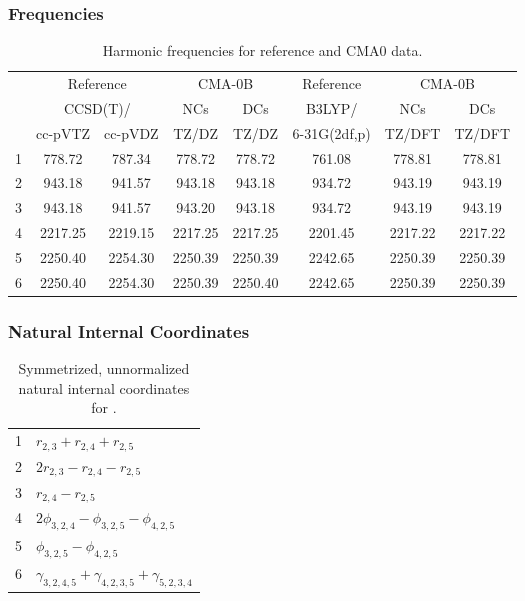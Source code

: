 \documentclass[10pt,oneside]{article}
\begin{document}
\clearpage

\subsubsection*{Frequencies}
\begin{table}[h!]
\centering
\caption{Harmonic frequencies for reference and CMA0 data.}
\begin{tabular}{cccccccc}
\toprule
{} & \multicolumn{2}{c}{Reference} & \multicolumn{2}{c}{CMA-0B} &    Reference & \multicolumn{2}{c}{CMA-0B} \\
{} & \multicolumn{2}{c}{CCSD(T)/} &     NCs &     DCs &       B3LYP/ &     NCs &     DCs \\
{} &   cc-pVTZ & cc-pVDZ &   TZ/DZ &   TZ/DZ & 6-31G(2df,p) &  TZ/DFT &  TZ/DFT \\
\midrule
1 &    778.72 &  787.34 &  778.72 &  778.72 &       761.08 &  778.81 &  778.81 \\
2 &    943.18 &  941.57 &  943.18 &  943.18 &       934.72 &  943.19 &  943.19 \\
3 &    943.18 &  941.57 &  943.20 &  943.18 &       934.72 &  943.19 &  943.19 \\
4 &   2217.25 & 2219.15 & 2217.25 & 2217.25 &      2201.45 & 2217.22 & 2217.22 \\
5 &   2250.40 & 2254.30 & 2250.39 & 2250.39 &      2242.65 & 2250.39 & 2250.39 \\
6 &   2250.40 & 2254.30 & 2250.39 & 2250.40 &      2242.65 & 2250.39 & 2250.39 \\
\bottomrule
\end{tabular}
\end{table}

\clearpage

\subsubsection*{Natural Internal Coordinates}
\begin{table}[h!]
\centering
\caption{Symmetrized, unnormalized natural internal coordinates for .}
\small
\begin{tabular}{ll}
  1   & $r_{2,3} + r_{2,4} + r_{2,5}$ \\
  2   & $2r_{2,3} - r_{2,4} - r_{2,5}$ \\
  3   & $r_{2,4} - r_{2,5}$ \\
  4   & $2\phi_{3,2,4} - \phi_{3,2,5} - \phi_{4,2,5}$ \\
  5   & $\phi_{3,2,5} - \phi_{4,2,5}$ \\
  6   & $\gamma_{3,2,4,5} + \gamma_{4,2,3,5} + \gamma_{5,2,3,4}$ \\
\end{tabular}
\end{table}
\end{document}
